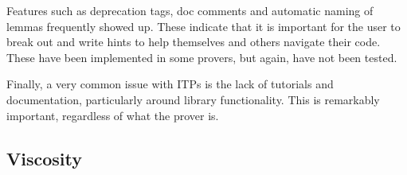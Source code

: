 \documentclass[
]{article}
\begin{document}
Features such as deprecation tags, doc comments and automatic naming of
lemmas frequently showed up. These indicate that it is important for the
user to break out and write hints to help themselves and others navigate
their code. These have been implemented in some provers, but again, have
not been tested.

Finally, a very common issue with ITPs is the lack of tutorials and
documentation, particularly around library functionality. This is
remarkably important, regardless of what the prover is.

\hypertarget{viscosity-1}{%
\subsection{Viscosity}\label{viscosity-1}}

\hypertarget{tbl:viscosity}{}
\end{document}
